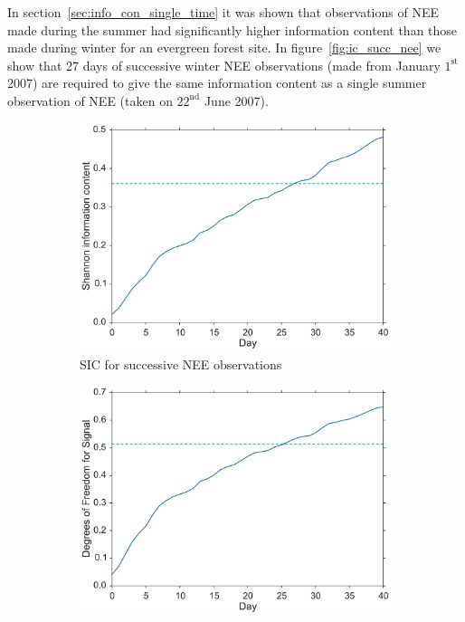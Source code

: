 \documentclass[11pt]{article}
\begin{document}
In section~\ref{sec:info_con_single_time} it was shown that observations of NEE made during the summer had significantly higher information content than those made during winter for an evergreen forest site. In figure~\ref{fig:ic_succ_nee} we show that 27 days of successive winter NEE observations (made from January \(1^{\text{st}}\) 2007) are required to give the same information content as a single summer observation of NEE (taken on \( 22^{\text{nd}} \) June 2007).

\begin{figure}[ht]
    \centering
    \begin{subfigure}[b]{0.45\textwidth}
        \includegraphics[width=\textwidth]{sic_succ_nee.pdf}
        \caption{SIC for successive NEE observations}
        \label{fig:sic_succ_nee}
    \end{subfigure} \hspace{5mm}
    \begin{subfigure}[b]{0.45\textwidth}
        \includegraphics[width=\textwidth]{dfs_succ_nee.pdf}

\end{subfigure}
\end{figure}
\end{document}
